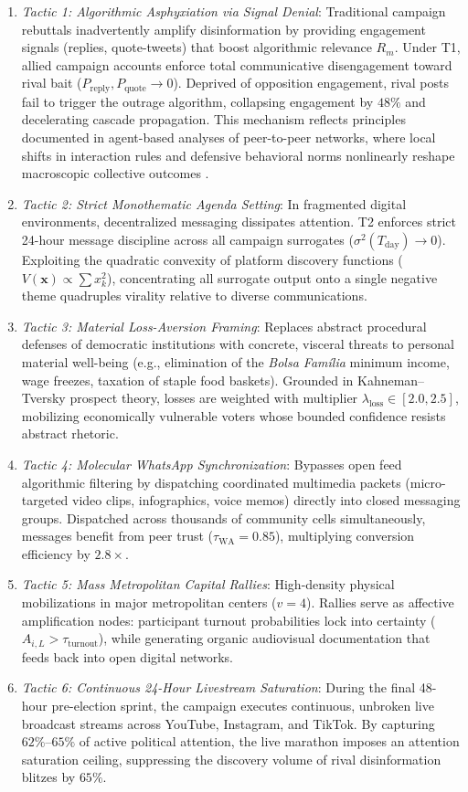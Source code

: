 \documentclass[11pt,a4paper]{article}
\begin{document}
\begin{enumerate}
    \item \emph{Tactic 1: Algorithmic Asphyxiation via Signal Denial}: Traditional campaign rebuttals inadvertently amplify disinformation by providing engagement signals (replies, quote-tweets) that boost algorithmic relevance $R_m$. Under T1, allied campaign accounts enforce total communicative disengagement toward rival bait ($P_{\mathrm{reply}}, P_{\mathrm{quote}} \to 0$). Deprived of opposition engagement, rival posts fail to trigger the outrage algorithm, collapsing engagement by $48\%$ and decelerating cascade propagation. This mechanism reflects principles documented in agent-based analyses of peer-to-peer networks, where local shifts in interaction rules and defensive behavioral norms nonlinearly reshape macroscopic collective outcomes \citep{alvarenga2026power}.
    \item \emph{Tactic 2: Strict Monothematic Agenda Setting}: In fragmented digital environments, decentralized messaging dissipates attention. T2 enforces strict 24-hour message discipline across all campaign surrogates ($\sigma^2(T_{\mathrm{day}}) \to 0$). Exploiting the quadratic convexity of platform discovery functions ($V(\mathbf{x}) \propto \sum x_k^2$), concentrating all surrogate output onto a single negative theme quadruples virality relative to diverse communications.
    \item \emph{Tactic 3: Material Loss-Aversion Framing}: Replaces abstract procedural defenses of democratic institutions with concrete, visceral threats to personal material well-being (e.g., elimination of the \emph{Bolsa Fam{\'i}lia} minimum income, wage freezes, taxation of staple food baskets). Grounded in Kahneman--Tversky prospect theory, losses are weighted with multiplier $\lambda_{\mathrm{loss}} \in [2.0, 2.5]$, mobilizing economically vulnerable voters whose bounded confidence resists abstract rhetoric.
    \item \emph{Tactic 4: Molecular WhatsApp Synchronization}: Bypasses open feed algorithmic filtering by dispatching coordinated multimedia packets (micro-targeted video clips, infographics, voice memos) directly into closed messaging groups. Dispatched across thousands of community cells simultaneously, messages benefit from peer trust ($\tau_{\text{WA}} = 0.85$), multiplying conversion efficiency by $2.8\times$.
    \item \emph{Tactic 5: Mass Metropolitan Capital Rallies}: High-density physical mobilizations in major metropolitan centers ($v=4$). Rallies serve as affective amplification nodes: participant turnout probabilities lock into certainty ($A_{i,L} > \tau_{\mathrm{turnout}}$), while generating organic audiovisual documentation that feeds back into open digital networks.
    \item \emph{Tactic 6: Continuous 24-Hour Livestream Saturation}: During the final 48-hour pre-election sprint, the campaign executes continuous, unbroken live broadcast streams across YouTube, Instagram, and TikTok. By capturing $62\%$--$65\%$ of active political attention, the live marathon imposes an attention saturation ceiling, suppressing the discovery volume of rival disinformation blitzes by $65\%$.
\end{enumerate}
\end{document}
